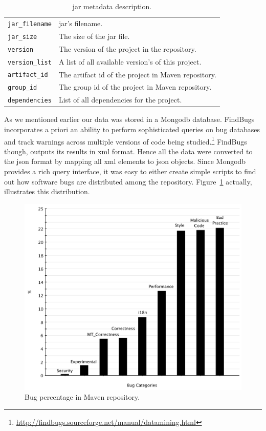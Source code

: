 \documentclass{sig-alternate}
\begin{document}
\begin{table}
\centering
\begin{tabular}{l p{5.0cm}}
 \hline
\verb|jar_filename| & {\sc jar}'s filename. \\
\verb|jar_size| & The size of the {\sc jar} file. \\
\verb|version| & The version of the project in the repository. \\
\verb|version_list| & A list of all available version's of this project. \\
\verb|artifact_id| & The artifact {\sc id} of the project in Maven repository. \\
\verb|group_id| & The group {\sc id} of the project in Maven repository. \\
\verb|dependencies| & List of all dependencies for the project. \\
 \hline
 \end{tabular}
\caption{{\sc jar} metadata description.}
\label{tbl:metadata-description}
\end{table}

As we mentioned earlier our data was stored in a
Mongo{\sc db} database.
FindBugs incorporates a priori an ability to perform
sophisticated queries on bug databases and
track warnings across multiple versions of code being
studied.\footnote{\url{http://findbugs.sourceforge.net/manual/datamining.html}}
FindBugs though,
outputs its results in  {\sc xml} format.
Hence all the data were
converted to the {\sc json} format
by mapping all {\sc xml} elements to {\sc json} objects.
Since Mongo{\sc db} provides a rich query interface,
it was easy to either create
simple scripts to find out
how software bugs are distributed among the
repository. Figure~\ref{fig:bug-per}
actually, illustrates this distribution.

\begin{figure}[t]
	\centering
	\includegraphics[scale=0.32]{figures/bug_percent}
	\caption{Bug percentage in Maven repository.}
	\label{fig:bug-per} 
\end{figure}
\end{document}
